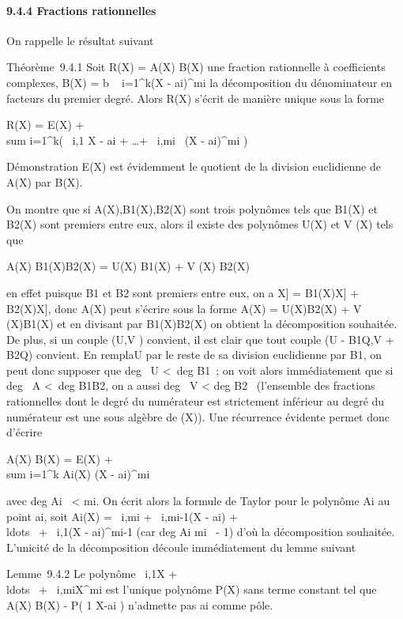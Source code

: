 \paragraph{9.4.4 Fractions rationnelles}

On rappelle le résultat suivant

Théorème~9.4.1 Soit R(X) = A(X) \over B(X) une
fraction rationnelle à coefficients complexes, B(X) =
b\∏ ~
i=1^k(X - ai)^mi la
décomposition du dénominateur en facteurs du premier degré. Alors R(X)
s'écrit de manière unique sous la forme

R(X) = E(X) + \\sum
i=1^k\left ( \alpha~i,1
\over X - ai +
\ldots + \alpha~i,mi~
\over (X - ai)^mi
\right )

Démonstration E(X) est évidemment le quotient de la division euclidienne
de A(X) par B(X).

On montre que si A(X),B1(X),B2(X) sont trois
polynômes tels que B1(X) et B2(X) sont premiers
entre eux, alors il existe des polynômes U(X) et V (X) tels que

 A(X) \over B1(X)B2(X) = U(X)
\over B1(X) + V (X) \over
B2(X)

en effet puisque B1 et B2 sont premiers entre eux,
on a \mathbb{C}{[}X{]} = B1(X)\mathbb{C}{[}X{]} + B2(X)\mathbb{C}{[}X{]}, donc
A(X) peut s'écrire sous la forme A(X) = U(X)B2(X) + V
(X)B1(X) et en divisant par B1(X)B2(X) on
obtient la décomposition souhaitée. De plus, si un couple (U,V )
convient, il est clair que tout couple (U - B1Q,V +
B2Q) convient. En rempla\ccant U par le
reste de sa division euclidienne par B1, on peut donc supposer
que deg~ U \textless{}\
deg B1~; on voit alors immédiatement que si
deg~ A \textless{}\
deg B1B2, on a aussi deg~
V \textless{} deg B2~ (l'ensemble des
fractions rationnelles dont le degré du numérateur est strictement
inférieur au degré du numérateur est une sous algèbre de (X)). Une
récurrence évidente permet donc d'écrire

 A(X) \over B(X) = E(X) + \\sum
i=1^k Ai(X) \over (X -
ai)^mi

avec deg Ai~ \textless{}
mi. On écrit alors la formule de Taylor pour le polynôme
Ai au point ai, soit Ai(X) =
\alpha~i,mi + \alpha~i,mi-1(X -
ai) +
\\ldots~ +
\alpha~i,1(X - ai)^mi-1 (car
deg Ai \leq mi~ - 1) d'où la
décomposition souhaitée. L'unicité de la décomposition découle
immédiatement du lemme suivant

Lemme~9.4.2 Le polynôme \alpha~i,1X +
\\ldots~ +
\alpha~i,miX^mi est l'unique polynôme
P(X) sans terme constant tel que  A(X) \over B(X) -
P( 1 \over X-ai ) n'admette pas
ai comme pôle.

